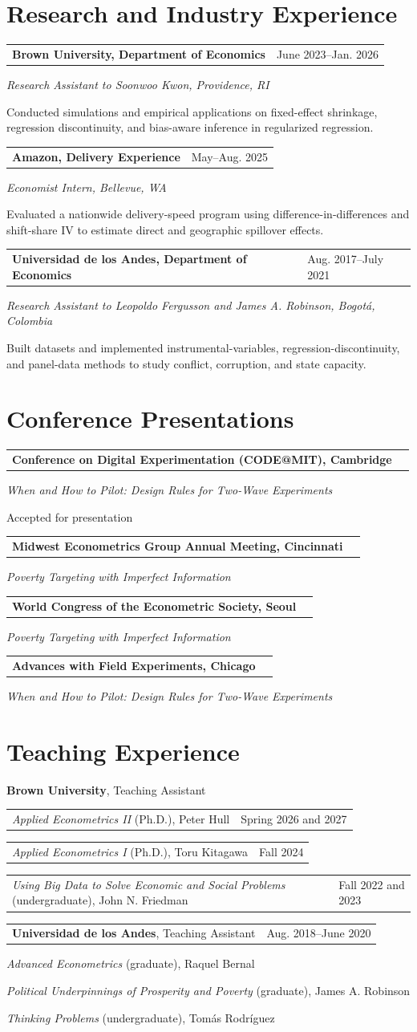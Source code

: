 \documentclass[11pt,letterpaper]{article}
\makeatletter
\newcommand{\datedline}[2]{%
  \noindent\begin{tabularx}{\textwidth}{@{}X>{\raggedleft\arraybackslash}p{1.48in}@{}}%
  #1 & #2
  \end{tabularx}\par
}
\newcommand{\experience}[4]{%
  \needspace{5\baselineskip}%
  \datedline{\textbf{#1}}{#2}%
  \textit{#3}\par
  #4\par\vspace{0.40em}%
}
\newcommand{\presentation}[3]{%
  \needspace{4\baselineskip}%
  \datedline{\textbf{#1}}{#2}%
  {\leftskip=0.18in\itshape #3\par}%
  \vspace{0.65em}%
}
\makeatother
\begin{document}
\section{Research and Industry Experience}
\experience{Brown University, Department of Economics}{June 2023--Jan. 2026}
  {Research Assistant to Soonwoo Kwon, Providence, RI}
  {Conducted simulations and empirical applications on fixed-effect shrinkage,
   regression discontinuity, and bias-aware inference in regularized regression.}
\experience{Amazon, Delivery Experience}{May--Aug. 2025}
  {Economist Intern, Bellevue, WA}
  {Evaluated a nationwide delivery-speed program using difference-in-differences
   and shift-share IV to estimate direct and geographic spillover effects.}
\experience{Universidad de los Andes, Department of Economics}{Aug. 2017--July 2021}
  {Research Assistant to Leopoldo Fergusson and James A. Robinson, Bogot\'a, Colombia}
  {Built datasets and implemented instrumental-variables, regression-discontinuity,
   and panel-data methods to study conflict, corruption, and state capacity.}

\section{Conference Presentations}
\presentation{Conference on Digital Experimentation (CODE@MIT), Cambridge}{2026}
  {When and How to Pilot: Design Rules for Two-Wave Experiments\par{\normalfont\fontsize{10}{12}\selectfont\color{mutedink}Accepted for presentation}}
\presentation{Midwest Econometrics Group Annual Meeting, Cincinnati}{2026}
  {Poverty Targeting with Imperfect Information}
\presentation{World Congress of the Econometric Society, Seoul}{2025}
  {Poverty Targeting with Imperfect Information}
\presentation{Advances with Field Experiments, Chicago}{2025}
  {When and How to Pilot: Design Rules for Two-Wave Experiments}

\section{Teaching Experience}
\textbf{Brown University}, Teaching Assistant\par\vspace{0.10em}
\datedline{\textit{Applied Econometrics II} (Ph.D.), Peter Hull}{Spring 2026 and 2027}
\datedline{\textit{Applied Econometrics I} (Ph.D.), Toru Kitagawa}{Fall 2024}
\datedline{\textit{Using Big Data to Solve Economic and Social Problems}
  (undergraduate), John N. Friedman}{Fall 2022 and 2023}
\vspace{0.30em}
\datedline{\textbf{Universidad de los Andes}, Teaching Assistant}{Aug. 2018--June 2020}
\textit{Advanced Econometrics} (graduate), Raquel Bernal\par
\textit{Political Underpinnings of Prosperity and Poverty} (graduate), James A. Robinson\par
\textit{Thinking Problems} (undergraduate), Tom\'as Rodr\'iguez\par
\end{document}

